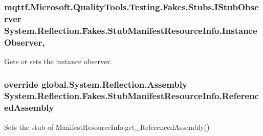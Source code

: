 \hypertarget{class_system_1_1_reflection_1_1_fakes_1_1_stub_manifest_resource_info_a19ee16cef763ab5ef353ae02a09a9c66}{
\subsubsection[{Instance\-Observer}]{\setlength{\rightskip}{0pt plus 5cm}mqttf.\-Microsoft.\-Quality\-Tools.\-Testing.\-Fakes.\-Stubs.\-I\-Stub\-Observer System.\-Reflection.\-Fakes.\-Stub\-Manifest\-Resource\-Info.\-Instance\-Observer\hspace{0.3cm}{\ttfamily [get]}, {\ttfamily [set]}}}\label{class_system_1_1_reflection_1_1_fakes_1_1_stub_manifest_resource_info_a19ee16cef763ab5ef353ae02a09a9c66}


Gets or sets the instance observer.

\hypertarget{class_system_1_1_reflection_1_1_fakes_1_1_stub_manifest_resource_info_accd83c36a03d9f09c7dc653076f233fc}{
\subsubsection[{Referenced\-Assembly}]{\setlength{\rightskip}{0pt plus 5cm}override global.\-System.\-Reflection.\-Assembly System.\-Reflection.\-Fakes.\-Stub\-Manifest\-Resource\-Info.\-Referenced\-Assembly\hspace{0.3cm}{\ttfamily [get]}}}\label{class_system_1_1_reflection_1_1_fakes_1_1_stub_manifest_resource_info_accd83c36a03d9f09c7dc653076f233fc}


Sets the stub of Manifest\-Resource\-Info.\-get\-\_\-\-Referenced\-Assembly()

